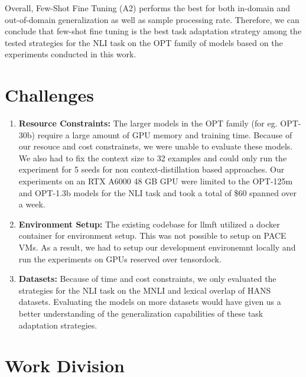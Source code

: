 \documentclass[10pt,twocolumn,letterpaper]{article}
\begin{document}
Overall, Few-Shot Fine Tuning (A2) performs the best for both in-domain and out-of-domain generalization as well as sample processing rate. Therefore, we can conclude that few-shot fine tuning is the best task adaptation strategy among the tested strategies for the NLI task on the OPT family of models based on the experiments conducted in this work.






\section{Challenges}
\begin{enumerate}
    \item \textbf{Resource Constraints:} The larger models in the OPT family (for eg. OPT-30b) require a large amount of GPU memory and training time. Because of our resouce and cost constrainsts, we were unable to evaluate these models. We also had to fix the context size to 32 examples and could only run the experiment for 5 seeds for non context-distillation based approaches. Our experiments on an RTX A6000 48 GB GPU were limited to the OPT-125m and OPT-1.3b models for the NLI task and took a total of \$60 spanned over a week.
    \item \textbf{Environment Setup:} The existing codebase for llmft utilized a docker container for environment setup. This was not possible to setup on PACE VMs. As a result, we had to setup our development environemnt locally and run the experiments on GPUs reserved over tensordock.  
    \item \textbf{Datasets:} Because of time and cost constraints, we only evaluated the strategies for the NLI task on the MNLI and lexical overlap of HANS datasets. Evaluating the models on more datasets would have given us a better understanding of the generalization capabilities of these task adaptation strategies.
\end{enumerate}
\section{Work Division}
\end{document}
